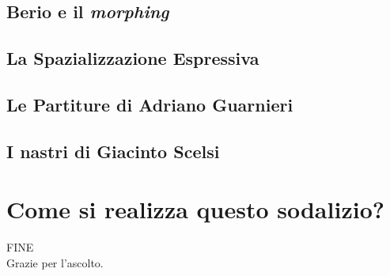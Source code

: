 \documentclass[compress]{beamer}
\begin{document}


\subsection[Morphing]{Berio e il {\it morphing}}



\subsection[Spazializzazione]{La Spazializzazione Espressiva}



\subsection[Guarnieri]{Le Partiture di Adriano Guarnieri}



\subsection[Scelsi]{I nastri di Giacinto Scelsi}



\section[Come]{Come si realizza questo sodalizio?}



\begin{frame}
    \begin{center}
        {\Huge FINE}\\[2\baselineskip]
        Grazie per l'ascolto.
    \end{center}
\end{frame}
\end{document}
